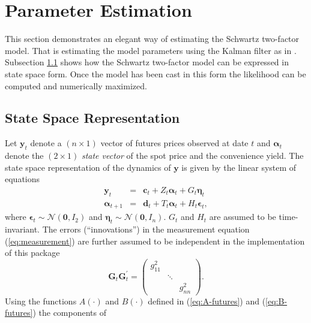 \documentclass[a4paper,11pt]{article}
\begin{document}
\section{Parameter Estimation}\label{sec:Estimation}
This section demonstrates an elegant way of estimating the Schwartz
two-factor model. That is estimating the model parameters using the
Kalman filter as in \cite{Schwartz1997}. Subsection
\ref{sec:stateSpace} shows how the Schwartz two-factor model can be
expressed in state space form. Once the model has been cast in this
form the likelihood can be computed and numerically maximized.
\subsection{State Space Representation}
\label{sec:stateSpace}
Let $\mathbf{y}_t$ denote a $(n\times{1})$ vector of futures prices
observed at date $t$ and $\boldsymbol{\alpha}_t$ denote the
$(2\times{1})$ \emph{state vector} of the spot price and the
convenience yield. The state space representation of the dynamics of
$\mathbf{y}$ is given by the linear system of equations
\begin{eqnarray}
  \mathbf{y}_t &=& \mathbf{c}_t + Z_t \boldsymbol{\alpha}_t + G_t
  \boldsymbol{\eta}_t  \label{eq:measurement}\\
  \boldsymbol{\alpha}_{t + 1} &=& \mathbf{d}_t + T_t \boldsymbol{\alpha}_t +
  H_t \boldsymbol{\epsilon}_t, \label{eq:transition}
\end{eqnarray}
where $\boldsymbol{\epsilon}_t \sim \mathcal{N}(\boldsymbol{0}, I_2)$
and $\boldsymbol{\eta}_t \sim \mathcal{N}(\boldsymbol{0}, I_n).$ $G_t$
and $H_t$ are assumed to be time-invariant.  The errors
(``innovations'') in the measurement equation (\ref{eq:measurement})
are further assumed to be independent in the implementation of this
package
\begin{equation}
  \label{eq:1}
  \mathbf{G}_t\mathbf{G}^{'}_t = \begin{pmatrix}g_{11}^2&&\\
    &\ddots&\\ &&g_{nn}^2\end{pmatrix}.
\end{equation}
Using the functions $A(\cdot)$ and $B(\cdot)$ defined in
(\ref{eq:A-futures}) and (\ref{eq:B-futures}) the components of
\end{document}
